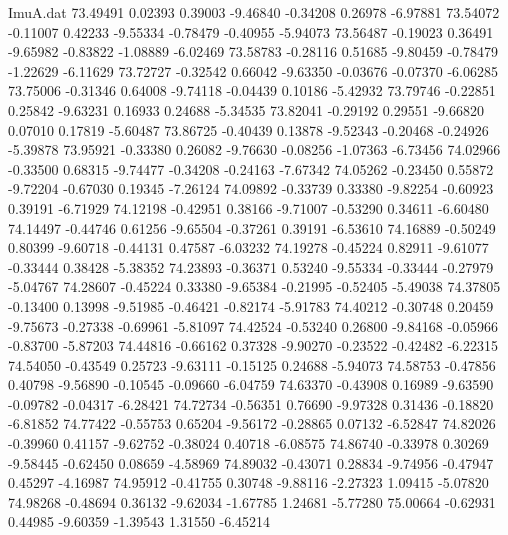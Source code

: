 \begin{filecontents}{ImuA.dat}
  73.49491    0.02393    0.39003   -9.46840   -0.34208    0.26978   -6.97881
  73.54072   -0.11007    0.42233   -9.55334   -0.78479   -0.40955   -5.94073
  73.56487   -0.19023    0.36491   -9.65982   -0.83822   -1.08889   -6.02469
  73.58783   -0.28116    0.51685   -9.80459   -0.78479   -1.22629   -6.11629
  73.72727   -0.32542    0.66042   -9.63350   -0.03676   -0.07370   -6.06285
  73.75006   -0.31346    0.64008   -9.74118   -0.04439    0.10186   -5.42932
  73.79746   -0.22851    0.25842   -9.63231    0.16933    0.24688   -5.34535
  73.82041   -0.29192    0.29551   -9.66820    0.07010    0.17819   -5.60487
  73.86725   -0.40439    0.13878   -9.52343   -0.20468   -0.24926   -5.39878
  73.95921   -0.33380    0.26082   -9.76630   -0.08256   -1.07363   -6.73456
  74.02966   -0.33500    0.68315   -9.74477   -0.34208   -0.24163   -7.67342
  74.05262   -0.23450    0.55872   -9.72204   -0.67030    0.19345   -7.26124
  74.09892   -0.33739    0.33380   -9.82254   -0.60923    0.39191   -6.71929
  74.12198   -0.42951    0.38166   -9.71007   -0.53290    0.34611   -6.60480
  74.14497   -0.44746    0.61256   -9.65504   -0.37261    0.39191   -6.53610
  74.16889   -0.50249    0.80399   -9.60718   -0.44131    0.47587   -6.03232
  74.19278   -0.45224    0.82911   -9.61077   -0.33444    0.38428   -5.38352
  74.23893   -0.36371    0.53240   -9.55334   -0.33444   -0.27979   -5.04767
  74.28607   -0.45224    0.33380   -9.65384   -0.21995   -0.52405   -5.49038
  74.37805   -0.13400    0.13998   -9.51985   -0.46421   -0.82174   -5.91783
  74.40212   -0.30748    0.20459   -9.75673   -0.27338   -0.69961   -5.81097
  74.42524   -0.53240    0.26800   -9.84168   -0.05966   -0.83700   -5.87203
  74.44816   -0.66162    0.37328   -9.90270   -0.23522   -0.42482   -6.22315
  74.54050   -0.43549    0.25723   -9.63111   -0.15125    0.24688   -5.94073
  74.58753   -0.47856    0.40798   -9.56890   -0.10545   -0.09660   -6.04759
  74.63370   -0.43908    0.16989   -9.63590   -0.09782   -0.04317   -6.28421
  74.72734   -0.56351    0.76690   -9.97328    0.31436   -0.18820   -6.81852
  74.77422   -0.55753    0.65204   -9.56172   -0.28865    0.07132   -6.52847
  74.82026   -0.39960    0.41157   -9.62752   -0.38024    0.40718   -6.08575
  74.86740   -0.33978    0.30269   -9.58445   -0.62450    0.08659   -4.58969
  74.89032   -0.43071    0.28834   -9.74956   -0.47947    0.45297   -4.16987
  74.95912   -0.41755    0.30748   -9.88116   -2.27323    1.09415   -5.07820
  74.98268   -0.48694    0.36132   -9.62034   -1.67785    1.24681   -5.77280
  75.00664   -0.62931    0.44985   -9.60359   -1.39543    1.31550   -6.45214

\end{filecontents}
